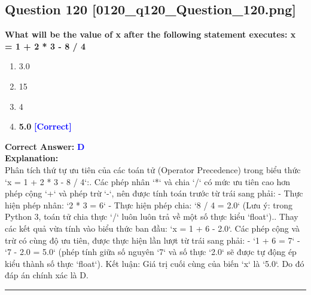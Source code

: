 \documentclass[11pt,a4paper]{article}
\begin{document}
\begin{minipage}{\textwidth}
\subsection*{Question 120 \quad \footnotesize{[0120_q120_Question_120.png]}}
\noindent \textbf{What will be the value of x after the following statement executes: x = 1 + 2 * 3 - 8 / 4}

\begin{enumerate}[label=\Alph*.]
    \item 3.0
    \item 15
    \item 4
    \item \textbf{5.0} \hfill \textcolor{blue}{\textbf{[Correct]}}
\end{enumerate}

\noindent \textbf{Correct Answer:} \textcolor{blue}{\textbf{D}} \\[4pt]
\noindent \textbf{Explanation:}\\
Phân tích thứ tự ưu tiên của các toán tử (Operator Precedence) trong biểu thức `x = 1 + 2 * 3 - 8 / 4`:. Các phép nhân `*` và chia `/` có mức ưu tiên cao hơn phép cộng `+` và phép trừ `-`, nên được tính toán trước từ trái sang phải:\newline
   - Thực hiện phép nhân: `2 * 3 = 6`\newline
   - Thực hiện phép chia: `8 / 4 = 2.0` (Lưu ý: trong Python 3, toán tử chia thực `/` luôn luôn trả về một số thực kiểu `float`).. Thay các kết quả vừa tính vào biểu thức ban đầu:\newline
   `x = 1 + 6 - 2.0`. Các phép cộng và trừ có cùng độ ưu tiên, được thực hiện lần lượt từ trái sang phải:\newline
   - `1 + 6 = 7`\newline
   - `7 - 2.0 = 5.0` (phép tính giữa số nguyên `7` và số thực `2.0` sẽ được tự động ép kiểu thành số thực `float`).\newline
Kết luận: Giá trị cuối cùng của biến `x` là `5.0`. Do đó đáp án chính xác là D.
\end{minipage}
\vspace{0.8cm}
\hrule
\vspace{0.5cm}
\end{document}
